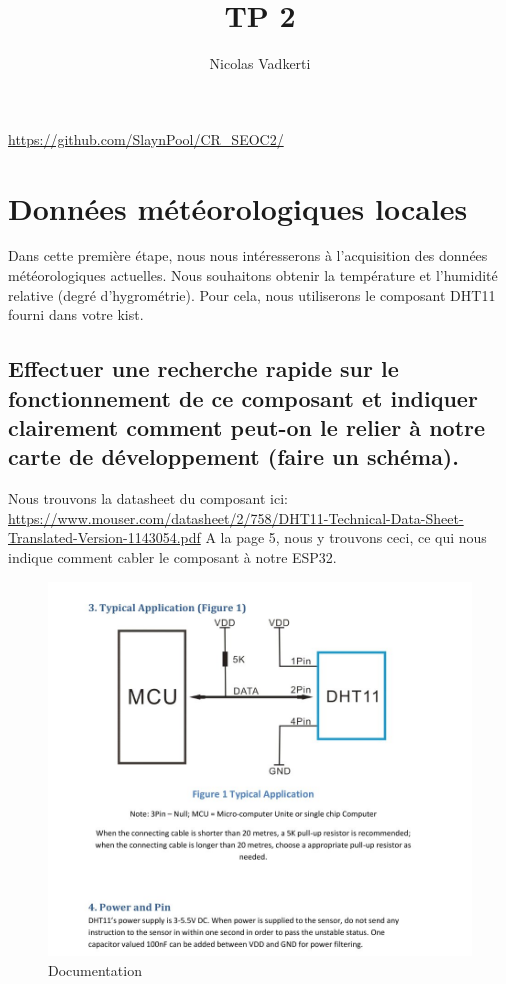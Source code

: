 \documentclass[10pt,a4paper]{article}
\title{TP 2}
\author{Nicolas Vadkerti}
\begin{document}
\maketitle


\url{https://github.com/SlaynPool/CR_SEOC2/}
\section{Données météorologiques locales}

Dans  cette  première  étape,  nous  nous  intéresserons à  l’acquisition  des  données  météorologiques actuelles. Nous souhaitons obtenir la température et l’humidité relative (degré d’hygrométrie). Pour cela, nous utiliserons le composant DHT11 fourni dans votre kist.
\subsection{Effectuer  une  recherche  rapide  sur  le  fonctionnement  de  ce  composant  et  indiquer  clairement comment peut-on le relier à notre carte de développement (faire un schéma).}
Nous trouvons la datasheet du composant ici: \url{https://www.mouser.com/datasheet/2/758/DHT11-Technical-Data-Sheet-Translated-Version-1143054.pdf}
A la page 5, nous y trouvons ceci, ce qui nous indique comment cabler le composant à notre ESP32.
\begin{figure}[h!]
\centering
 \includegraphics[scale=0.3]{image/1.jpg}
\caption{Documentation }
\label{fig:net }
\end{figure}\\
\end{document}
